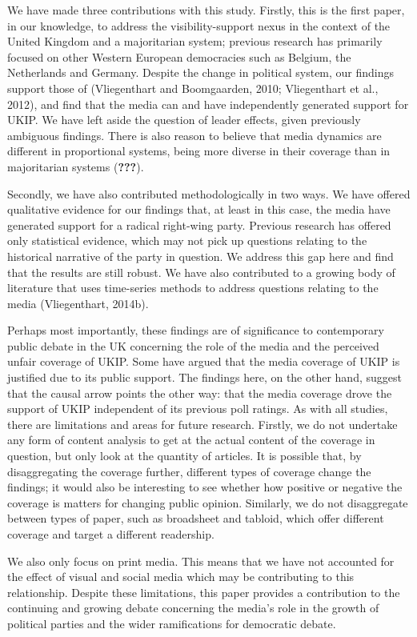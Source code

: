 \documentclass[12pt,article]{article}
\begin{document}
We have made three contributions with this study. Firstly, this is the
first paper, in our knowledge, to address the visibility-support nexus
in the context of the United Kingdom and a majoritarian system; previous
research has primarily focused on other Western European democracies
such as Belgium, the Netherlands and Germany. Despite the change in
political system, our findings support those of (Vliegenthart and
Boomgaarden, 2010; Vliegenthart et al., 2012), and find that the media
can and have independently generated support for UKIP. We have left
aside the question of leader effects, given previously ambiguous
findings. There is also reason to believe that media dynamics are
different in proportional systems, being more diverse in their coverage
than in majoritarian systems ({\textbf{???}}).

Secondly, we have also contributed methodologically in two ways. We have
offered qualitative evidence for our findings that, at least in this
case, the media have generated support for a radical right-wing party.
Previous research has offered only statistical evidence, which may not
pick up questions relating to the historical narrative of the party in
question. We address this gap here and find that the results are still
robust. We have also contributed to a growing body of literature that
uses time-series methods to address questions relating to the media
(Vliegenthart, 2014b).

Perhaps most importantly, these findings are of significance to
contemporary public debate in the UK concerning the role of the media
and the perceived unfair coverage of UKIP. Some have argued that the
media coverage of UKIP is justified due to its public support. The
findings here, on the other hand, suggest that the causal arrow points
the other way: that the media coverage drove the support of UKIP
independent of its previous poll ratings. As with all studies, there are
limitations and areas for future research. Firstly, we do not undertake
any form of content analysis to get at the actual content of the
coverage in question, but only look at the quantity of articles. It is
possible that, by disaggregating the coverage further, different types
of coverage change the findings; it would also be interesting to see
whether how positive or negative the coverage is matters for changing
public opinion. Similarly, we do not disaggregate between types of
paper, such as broadsheet and tabloid, which offer different coverage
and target a different readership.

We also only focus on print media. This means that we have not accounted
for the effect of visual and social media which may be contributing to
this relationship. Despite these limitations, this paper provides a
contribution to the continuing and growing debate concerning the media's
role in the growth of political parties and the wider ramifications for
democratic debate.
\end{document}
